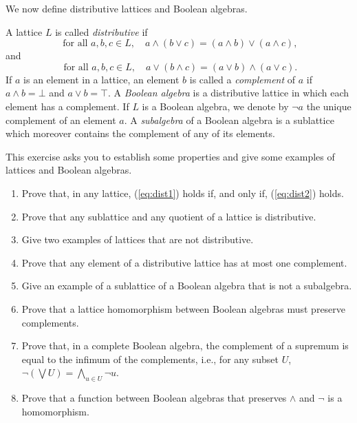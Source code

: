 We now define distributive lattices and Boolean algebras.
\begin{definition}
A lattice $L$ is called \emph{distributive} if
\begin{equation}\label{eq:dist1}
\text{ for all } a, b, c \in L, \quad a \wedge (b \vee c) = (a \wedge b) \vee (a \wedge c),
\end{equation}
and
\begin{equation} \label{eq:dist2}
  \text{ for all } a, b, c \in L, \quad a \vee (b \wedge c) = (a \vee b) \wedge (a \vee c).
\end{equation}
  If $a$ is an element in a lattice, an element $b$ is called a \emph{complement} of $a$ if $a \wedge b = \bot$ and $a \vee b = \top$. A \emph{Boolean algebra} is a distributive lattice in which each element has a complement. If $L$ is a Boolean algebra, we denote by $\neg a$ the unique complement of an element $a$. A \emph{subalgebra} of a Boolean algebra is a sublattice which moreover contains the complement of any of its elements.
  \end{definition}


\begin{exercise}\easy \label{exe:latticebasics} This exercise asks you to establish some properties and give some examples of lattices and Boolean algebras.
  \begin{enumerate}
  \item Prove that, in any lattice, (\ref{eq:dist1}) holds if, and only if, (\ref{eq:dist2}) holds.
  \item Prove that any sublattice and any quotient of a lattice is distributive.
  \item Give two examples of lattices that are not distributive.
  \item  Prove that any element of a distributive lattice has at most one complement.
  \item Give an example of a sublattice of a Boolean algebra that is not a subalgebra.
  \item Prove that a lattice homomorphism between Boolean algebras must preserve complements.
  \item Prove that, in a complete Boolean algebra, the complement of a supremum is equal to the infimum of the complements, i.e., for any subset $U$, $\neg(\bigvee U) = \bigwedge_{u \in U} \neg u$.
  \item Prove that a function between Boolean algebras that preserves $\wedge$ and $\neg$ is a homomorphism.
   \end{enumerate}
 \end{exercise}
 
